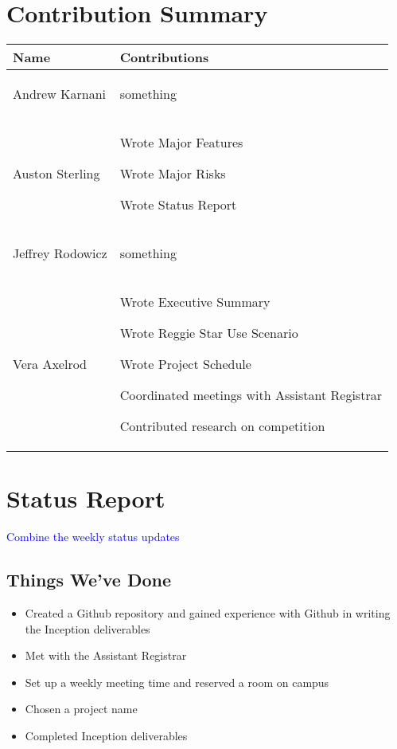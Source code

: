 \documentclass[11pt]{article}
\newenvironment{packed_itemize}{
\begin{itemize}
  \setlength{\itemsep}{1pt}
  \setlength{\parskip}{0pt}
  \setlength{\parsep}{0pt}
}{\end{itemize}}
\begin{document}
\section{Contribution Summary} %
\begin{tabular}{|m{1.4in}|m{4in}|}
\hline
\textbf{\large Name}     & \textbf{\large Contributions} \\
\hline\hline
 Andrew Karnani
	&
	 \begin{packed_itemize}
		\item something
	\end{packed_itemize}
\\
\hline
 Auston Sterling
	&
	 \begin{packed_itemize}
	        \item Wrote Major Features
                \item Wrote Major Risks
                \item Wrote Status Report
	\end{packed_itemize}
\\
\hline
Jeffrey Rodowicz
	&
	 \begin{packed_itemize}
		\item something
	\end{packed_itemize}
\\
\hline
Vera Axelrod
	&
	 \begin{packed_itemize}
		\item Wrote Executive Summary
		\item Wrote Reggie Star Use Scenario
		\item Wrote Project Schedule
		\item Coordinated meetings with Assistant Registrar
		\item Contributed research on competition
	\end{packed_itemize}
\\
\hline
\end{tabular}


\section{Status Report} %
\textcolor{blue}{Combine the weekly status updates}
\subsection{Things We've Done}
\begin{itemize}
\item Created a Github repository and gained experience with Github in writing the Inception deliverables
\item Met with the Assistant Registrar
\item Set up a weekly meeting time and reserved a room on campus
\item Chosen a project name
\item Completed Inception deliverables
\end{itemize}
\end{document}
